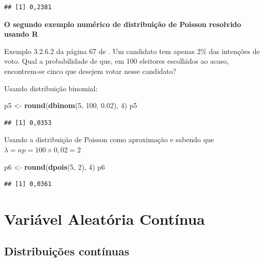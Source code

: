 \documentclass[
]{book}
\newenvironment{Shaded}{\begin{snugshade}}{\end{snugshade}}
\newcommand{\DecValTok}[1]{\textcolor[rgb]{0.00,0.00,0.81}{#1}}
\newcommand{\FloatTok}[1]{\textcolor[rgb]{0.00,0.00,0.81}{#1}}
\newcommand{\KeywordTok}[1]{\textcolor[rgb]{0.13,0.29,0.53}{\textbf{#1}}}
\newcommand{\NormalTok}[1]{#1}
\newcommand{\StringTok}[1]{\textcolor[rgb]{0.31,0.60,0.02}{#1}}
\begin{document}
\begin{verbatim}
## [1] 0,2381
\end{verbatim}

\textbf{O segundo exemplo numérico de distribuição de Poisson resolvido usando R}

Exemplo 3.2.6.2 da página 67 de \citet{Sartoris2013}. Um candidato tem apenas 2\% das intenções de voto. Qual a probabilidade de que, em 100 eleitores escolhidos ao acaso, encontrem-se cinco que desejem votar nesse candidato?

Usando distribuição binomial:

\begin{Shaded}
\begin{Highlighting}[]
\NormalTok{p5 <-}\StringTok{ }\KeywordTok{round}\NormalTok{(}\KeywordTok{dbinom}\NormalTok{(}\DecValTok{5}\NormalTok{, }\DecValTok{100}\NormalTok{, }\FloatTok{0.02}\NormalTok{), }\DecValTok{4}\NormalTok{)}
\NormalTok{p5}
\end{Highlighting}
\end{Shaded}

\begin{verbatim}
## [1] 0,0353
\end{verbatim}

Usando a distribuição de Poisson como aproximação e sabendo que \(\lambda = np = 100\times 0,02 = 2\)

\begin{Shaded}
\begin{Highlighting}[]
\NormalTok{p6 <-}\StringTok{ }\KeywordTok{round}\NormalTok{(}\KeywordTok{dpois}\NormalTok{(}\DecValTok{5}\NormalTok{, }\DecValTok{2}\NormalTok{), }\DecValTok{4}\NormalTok{)}
\NormalTok{p6}
\end{Highlighting}
\end{Shaded}

\begin{verbatim}
## [1] 0,0361
\end{verbatim}

\hypertarget{variuxe1vel-aleatuxf3ria-contuxednua}{%
\chapter{Variável Aleatória Contínua}\label{variuxe1vel-aleatuxf3ria-contuxednua}}

\hypertarget{distribuiuxe7uxf5es-contuxednuas}{%
\section{Distribuições contínuas}\label{distribuiuxe7uxf5es-contuxednuas}}
\end{document}

